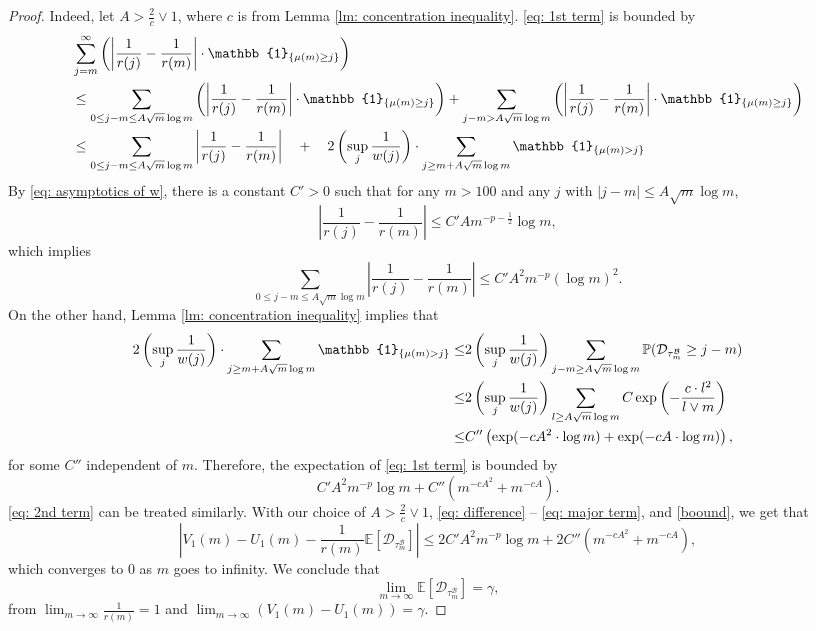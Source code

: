 \documentclass[twoside,12pt, a4paper, final]{article}
\numberwithin{equation}{section}
\theoremstyle{remark}
\newcommand{\abs}[1]{\left\vert #1 \right\vert}
\begin{document}
\begin{proof}
		Indeed, let $A> \frac{2}{c} \vee 1$, where $c$ is from Lemma \ref{lm: concentration inequality}. \eqref{eq: 1st term} is bounded by
		\begin{align}
			& \sum_{j=m}^{\infty} \left(\abs{\frac{1}{r(j)} -\frac{1}{r(m)} } \cdot \mathbb{1}_{\left\{\mu(m)\geq j \right\}}\right)\\
			& \leq  \sum_{0\leq j-m \leq A \sqrt{m}\log m } \left(\abs{\frac{1}{r(j)} -\frac{1}{r(m)} } \cdot \mathbb{1}_{\left\{\mu(m)\geq j \right\}}\right)
			+  \sum_{j-m > A\sqrt{m}\log m } \left(\abs{\frac{1}{r(j)} -\frac{1}{r(m)} } \cdot \mathbb{1}_{\left\{\mu(m)\geq j \right\}}\right)
			\notag
			\\
			&\leq  \sum_{0\leq j-m \leq A\sqrt{m}\log m } \abs{\frac{1}{r(j)} -\frac{1}{r(m)} }
			\quad +\quad 2\left(\sup_j \frac{1}{w(j)}\right) \cdot \sum_{j\geq m + A\sqrt{m}\log m } \mathbb{1}_{\left\{ \mu(m) > j \right\}}
			\label{low large difference}
		\end{align}
		By \eqref{eq: asymptotics of w}, there is a constant $C'>0$ such that for any $m>100 $ and any $j$ with $\abs{j-m}\leq A \sqrt m \log m $, 
		$$ \abs{\frac{1}{r(j)} -\frac{1}{r(m)} } \leq C' A m^{-p-\frac{1}{2}} \log m, $$
		which implies
		\[
		\sum_{0\leq j-m \leq A\sqrt{m}\log m } \abs{\frac{1}{r(j)} -\frac{1}{r(m)} } \le 
		C' A^2 m^{-p} (\log m)^2.
		\] On the other hand, Lemma \ref{lm: concentration inequality} implies that
		\begin{align*}
			2\left(\sup_j \frac{1}{w(j)}\right) \cdot \sum_{j\geq m + A\sqrt{m}\log m } \mathbb{1}_{\left\{ \mu(m) > j \right\}}
			\le & 2\left(\sup_j \frac{1}{w(j)}\right) \sum_{j-m \geq A \sqrt m \log m  } \mathbb{P}( \mathcal{D}_{\tau^{\mathcal{B}}_m} \geq j-m )  
			\notag 
			\\
			\leq& 2\left(\sup_j \frac{1}{w(j)}\right) \sum_{l \geq A \sqrt m \log m } C \exp\left( - \frac{c  \cdot l^2}{l \vee m}   \right)
			\notag\\
			\leq& C'' \left( \exp (- cA^2 \cdot \log m ) + \exp(-cA \cdot \log m) \right), 
		\end{align*} for some $C''$ independent of $m$. Therefore, the expectation of \eqref{eq: 1st term} is bounded by
		\begin{equation}\label{boound}
			C' A^2 m^{-p} \log m + C''  \left( m ^{-cA^2} +  m^{-cA} \right). 
		\end{equation}
		\eqref{eq: 2nd term} can be treated similarly. With our choice of $A >\frac{2}{c} \vee 1$,
		\eqref{eq: difference} -- 
		\eqref{eq: major term}, and \eqref{boound}, we get that
		$$ \abs{ V_1(m)- U_1(m) -\frac{1}{r(m)}\mathbb{E}\left[ \mathcal{D}_{\tau^{\mathcal{B}}_m} \right] }
		\leq 2C' A^2 m^{-p} \log m + 2C''  \left( m ^{-cA^2} +  m^{-cA} \right), 
		$$ 
		which converges to $0$ as $m$ goes to infinity. We conclude that 
		$$
		\lim_{m\to\infty}\mathbb{E}\left[ \mathcal{D}_{\tau^{\mathcal{B}}_m} \right] = \gamma, 
		$$ 
		from $\lim_{m\to\infty}\frac{1}{r(m)} =1$ and $ \lim_{m\to \infty} \left(V_1(m)-U_1(m) \right) = \gamma$.
	\end{proof}
	
\end{document}
